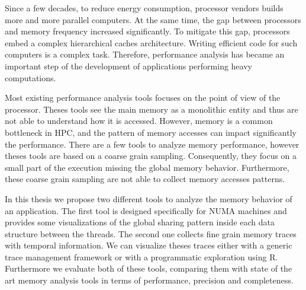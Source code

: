 
Since a few decades, to reduce energy consumption, processor vendors builds more and more parallel computers.
At the same time, the gap between processors and memory frequency increased significantly.
To mitigate this gap, processors embed a complex hierarchical caches architecture.
Writing efficient code for such computers is a complex task.
Therefore, performance analysis has became an important step of the development of applications performing heavy computations.

Most existing performance analysis tools focuses on the point of view of the processor.
Theses tools see the main memory as a monolithic entity and thus are not able to understand how it is accessed.
However, memory is a common bottleneck in \gls{HPC}, and the pattern of memory accesses can impact significantly the performance.
There are a few tools to analyze memory performance, however theses tools are based on a coarse grain sampling.
Consequently, they focus on a small part of the execution missing the global memory behavior.
Furthermore, these coarse grain sampling are not able to collect memory accesses patterns.

In this thesis we propose two different tools to analyze the memory behavior of an application.
The first tool is designed specifically for \gls{NUMA} machines and provides some visualizations of the global sharing pattern inside each data structure between the threads.
The second one collects fine grain memory traces with temporal information.
We can visualize theses traces either with a generic trace management framework or with a programmatic exploration using R.
Furthermore we evaluate both of these tools, comparing them with state of the art memory analysis tools in terms of performance, precision and completeness.

\glsresetall
